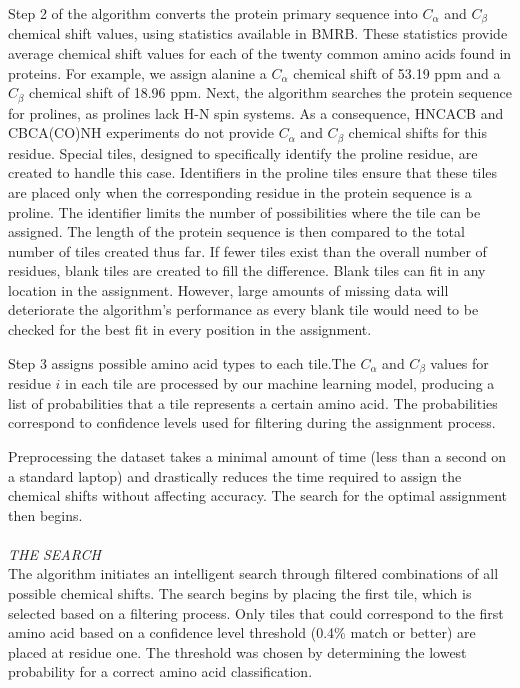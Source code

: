 \documentclass{article}
\begin{document}
Step 2 of the algorithm converts the protein primary sequence into $C_{\alpha}$ and $C_{\beta}$ chemical shift values, using statistics available in BMRB. These statistics provide average chemical shift values for each of the twenty common amino acids found in proteins. For example, we assign alanine a $C_{\alpha}$ chemical shift of 53.19 ppm and a $C_{\beta}$ chemical shift of 18.96 ppm. Next, the algorithm searches the protein sequence for prolines, as prolines lack H-N spin systems. As a consequence, HNCACB and CBCA(CO)NH experiments do not provide $C_{\alpha}$ and $C_{\beta}$ chemical shifts for this residue. Special tiles, designed to specifically identify the proline residue, are created to handle this case. Identifiers in the proline tiles ensure that these tiles are placed only when the corresponding residue in the protein sequence is a proline. The identifier limits the number of possibilities where the tile can be assigned. The length of the protein sequence is then compared to the total number of tiles created thus far. If fewer tiles exist than the overall number of residues, blank tiles are created to fill the difference. Blank tiles can fit in any location in the assignment. However, large amounts of missing data will deteriorate the algorithm's performance as every blank tile would need to be checked for the best fit in every position in the assignment. 

Step 3 assigns possible amino acid types to each tile.The $C_{\alpha}$ and $C_{\beta}$ values for residue $i$ in each tile are processed by our machine learning model, producing a list of probabilities that a tile represents a certain amino acid. The probabilities correspond to confidence levels used for filtering during the assignment process. 

Preprocessing the dataset takes a minimal amount of time (less than a second on a standard laptop) and drastically reduces the time required to assign the chemical shifts without affecting accuracy. The search for the optimal assignment then begins. 
\\\\
\noindent\textit{THE SEARCH}\\
The algorithm initiates an intelligent search through filtered combinations of all possible chemical shifts. The search begins by placing the first tile, which is selected based on a filtering process. Only tiles that could correspond to the first amino acid based on a confidence level threshold (0.4\% match or better) are placed at residue one. The threshold was chosen by determining the lowest probability for a correct amino acid classification.
\end{document}
